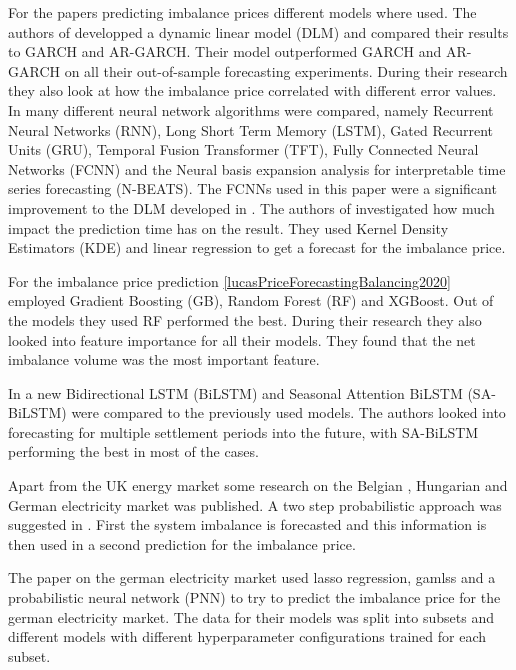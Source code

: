 \documentclass[class=scrbook, crop=false]{standalone}
\begin{document}
For the papers predicting imbalance prices different models where used.
The authors of \cite{limaBayesianPredictiveDistributions2023} developped a dynamic linear model (DLM) and compared their results to GARCH and AR-GARCH. Their model outperformed GARCH and AR-GARCH on all their out-of-sample forecasting experiments. During their research they also look at how the imbalance price correlated with different error values.
In \cite{ganeshForecastingImbalancePrice2024} many different neural network algorithms were compared, namely Recurrent Neural Networks (RNN), Long Short Term Memory (LSTM), Gated Recurrent Units (GRU), Temporal Fusion Transformer (TFT), Fully Connected Neural Networks (FCNN) and the Neural basis expansion analysis for interpretable time series forecasting (N-BEATS). The FCNNs used in this paper were a significant improvement to the DLM developed in \cite{limaBayesianPredictiveDistributions2023}.
The authors of \cite{browellPredictingElectricityImbalance2022} investigated how much impact the prediction time has on the result. They used Kernel Density Estimators (KDE) and linear regression to get a forecast for the imbalance price. 
 
 For the imbalance price prediction \ref{lucasPriceForecastingBalancing2020} employed Gradient Boosting (GB), Random Forest (RF) and XGBoost. Out of the models they used RF performed the best. During their research they also looked into feature importance for all their models. They found that the net imbalance volume was the most important feature.
 
 In \cite{dengSeasonalityDeepLearning2024} a new Bidirectional LSTM (BiLSTM) and Seasonal Attention BiLSTM (SA-BiLSTM) were compared to the previously used models. The authors looked into forecasting for multiple settlement periods into the future, with SA-BiLSTM performing the best in most of the cases.
 
Apart from the UK energy market some research on the Belgian \cite{bottieauVeryShortTermProbabilisticForecasting2020} \cite{dumasProbabilisticForecastingImbalance2019}, Hungarian \cite{balazsShorttermSystemImbalance2024} and German \cite{narajewskiProbabilisticForecastingGerman2022} electricity market was published.
A two step probabilistic approach was suggested in \cite{dumasProbabilisticForecastingImbalance2019}. First the system imbalance is forecasted and this information is then used in a second prediction for the imbalance price.

The paper on the german electricity market \cite{narajewskiProbabilisticForecastingGerman2022} used lasso regression, gamlss and a probabilistic neural network (PNN) to try to predict the imbalance price for the german electricity market. The data for their models was split into subsets and different models with different hyperparameter configurations trained for each subset.
\end{document}
